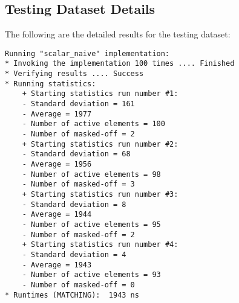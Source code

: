 \documentclass[12pt]{article}
\begin{document}
    
\subsection{Testing Dataset Details}
The following are the detailed results for the testing dataset:
\begin{lstlisting}[caption=Testing Dataset Execution Details, style=customc]
Running "scalar_naive" implementation:
* Invoking the implementation 100 times .... Finished
* Verifying results .... Success
* Running statistics:
    + Starting statistics run number #1:
    - Standard deviation = 161
    - Average = 1977
    - Number of active elements = 100
    - Number of masked-off = 2
    + Starting statistics run number #2:
    - Standard deviation = 68
    - Average = 1956
    - Number of active elements = 98
    - Number of masked-off = 3
    + Starting statistics run number #3:
    - Standard deviation = 8
    - Average = 1944
    - Number of active elements = 95
    - Number of masked-off = 2
    + Starting statistics run number #4:
    - Standard deviation = 4
    - Average = 1943
    - Number of active elements = 93
    - Number of masked-off = 0
* Runtimes (MATCHING):  1943 ns
\end{lstlisting}
\end{document}
